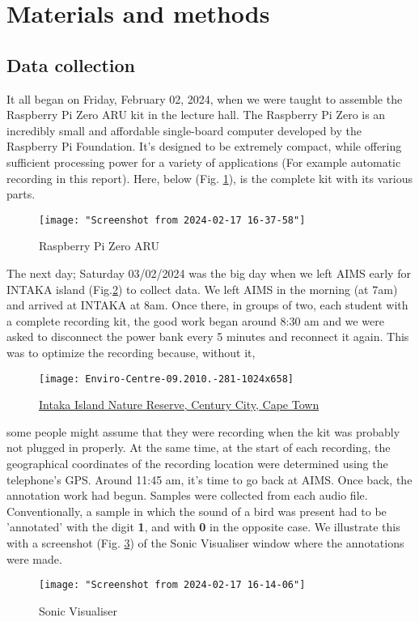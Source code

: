 \documentclass[conference]{IEEEtran}
\begin{document}
	\section{Materials and methods}

	
\subsection{Data collection}
It all began on Friday, February 02, 2024, when we were taught to assemble the Raspberry Pi Zero ARU kit in the lecture hall. The Raspberry Pi Zero is an incredibly small and affordable single-board computer developed by the Raspberry Pi Foundation. It's designed to be extremely compact, while offering sufficient processing power for a variety of applications (For example automatic recording in this report). Here, below (Fig. \ref{fig:screenshot-from-2024-02-17-16-37-58}), is the complete kit with its various parts.
 
\begin{figure}[!h]
	\centering
	\texttt{[image: "Screenshot from 2024-02-17 16-37-58"]}
	\caption{Raspberry Pi Zero 
		ARU 
	}
	\label{fig:screenshot-from-2024-02-17-16-37-58}
\end{figure}


The next day; Saturday 03/02/2024 was the big day when we left AIMS early for INTAKA island (Fig.\ref{fig:screenshot-from-2024-02-15-23-22-35}) to collect data. We left AIMS in the morning (at 7am) and arrived at INTAKA at 8am. Once there, in groups of two, each student with a complete recording kit, the good work began around 8:30 am and we were asked to disconnect the power bank every 5 minutes and reconnect it again. This was to optimize the recording because, without it, 

\begin{figure}[!h]
	\centering
\texttt{[image: Enviro-Centre-09.2010.-281-1024x658]}
\caption{\href{https://intaka.co.za/}{Intaka Island Nature Reserve, Century City, Cape Town}}
\label{fig:screenshot-from-2024-02-15-23-22-35}
\end{figure}
some people might assume that they were recording when the kit was probably not plugged in properly. At the same time, at the start of each recording, the geographical coordinates of the recording location were determined using the telephone's GPS. Around 11:45 am, it's time to go back at AIMS. Once back, the annotation work had begun. Samples were collected from each audio file. Conventionally, a sample in which the sound of a bird was present had to be 'annotated' with the digit \textbf{1}, and with \textbf{0} in the opposite case. We illustrate this with a screenshot (Fig. \ref{fig:screenshot-from-2024-02-17-16-14-06}) of the Sonic Visualiser window where the annotations were made.
\begin{figure}[!h]
	\centering
	\texttt{[image: "Screenshot from 2024-02-17 16-14-06"]}
	\caption{Sonic Visualiser}
	\label{fig:screenshot-from-2024-02-17-16-14-06}
\end{figure}
\end{document}
